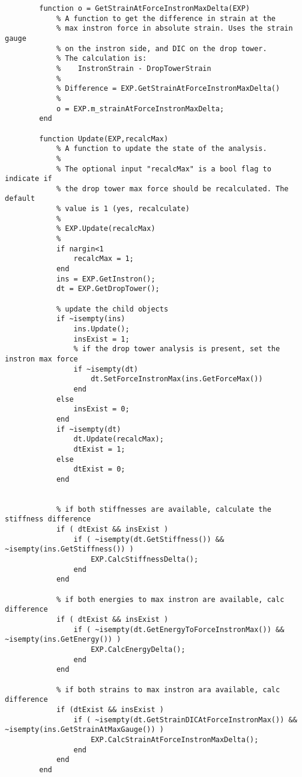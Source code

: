 \begin{lstlisting}
        function o = GetStrainAtForceInstronMaxDelta(EXP)
            % A function to get the difference in strain at the 
            % max instron force in absolute strain. Uses the strain gauge
            % on the instron side, and DIC on the drop tower.
            % The calculation is:
            %    InstronStrain - DropTowerStrain
            %
            % Difference = EXP.GetStrainAtForceInstronMaxDelta()
            %
            o = EXP.m_strainAtForceInstronMaxDelta;
        end        
        
        function Update(EXP,recalcMax)
            % A function to update the state of the analysis.
            %
            % The optional input "recalcMax" is a bool flag to indicate if
            % the drop tower max force should be recalculated. The default
            % value is 1 (yes, recalculate)
            %
            % EXP.Update(recalcMax)
            %
            if nargin<1
                recalcMax = 1;
            end
            ins = EXP.GetInstron();
            dt = EXP.GetDropTower();
            
            % update the child objects
            if ~isempty(ins)
                ins.Update();
                insExist = 1;
                % if the drop tower analysis is present, set the instron max force
                if ~isempty(dt)
                    dt.SetForceInstronMax(ins.GetForceMax())
                end
            else
                insExist = 0;
            end
            if ~isempty(dt)
                dt.Update(recalcMax);
                dtExist = 1;
            else
                dtExist = 0;
            end
            
            
            % if both stiffnesses are available, calculate the stiffness difference
            if ( dtExist && insExist )
                if ( ~isempty(dt.GetStiffness()) && ~isempty(ins.GetStiffness()) )
                    EXP.CalcStiffnessDelta();
                end
            end
            
            % if both energies to max instron are available, calc difference
            if ( dtExist && insExist )
                if ( ~isempty(dt.GetEnergyToForceInstronMax()) && ~isempty(ins.GetEnergy()) )
                    EXP.CalcEnergyDelta();
                end
            end
            
            % if both strains to max instron ara available, calc difference
            if (dtExist && insExist )
                if ( ~isempty(dt.GetStrainDICAtForceInstronMax()) && ~isempty(ins.GetStrainAtMaxGauge()) )
                    EXP.CalcStrainAtForceInstronMaxDelta();
                end
            end
        end
        

\end{lstlisting}
